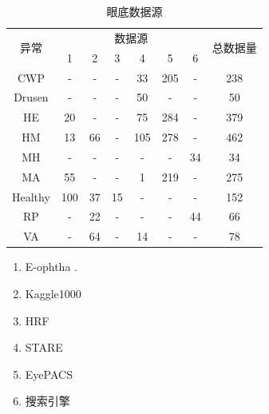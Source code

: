 \documentclass{article}
\begin{document}
		\begin{minipage}[t]{0.6\linewidth}
			{
				\fontsize{9}{12}\selectfont
				{
					\begin{longtable}{cccccccc}
						\caption{眼底数据源}
						\label{tb:Fundus_source}\\
						\toprule
						\multirow{2}{*}{异常}&\multicolumn{6}{c}{数据源}&\multirow{2}{*}{总数据量}\\
						&1&2&3&4&5&6&\\
						\midrule
						CWP    &-  &- &- &33 &205&- &238\\
						Drusen &-  &- &- &50 &-  &- &50 \\     
						HE     &20 &- &- &75 &284&- &379\\ 
						HM     &13 &66&- &105&278&- &462\\     
						MH     &-  &- &- &-  &-  &34&34 \\        
						MA     &55 &- &- &1  &219&- &275\\
						Healthy&100&37&15&-  &-  &- &152\\      
						RP     &-  &22&- &-  &-  &44&66 \\         
						VA     &-  &64&- &14 &-  &- &78 \\
						
						\bottomrule
					\end{longtable}
					
					\vspace{1cm}
					\begin{enumerate}[left=1.5cm]
						
						\item E-ophtha \autocite{E_ophtha}.
						\vspace{-0.2cm}
						
						\item Kaggle1000 \autocite{1000Fundus_Pytorch_TransferLearning}
						\vspace{-0.2cm}
						
						\item HRF \autocite{HRF_2013}
						\vspace{-0.2cm}
						
						\item STARE \autocite{STARE}
						\vspace{-0.2cm}
						
						\item EyePACS \autocite{DR_dataset}
						\vspace{-0.2cm}
						
						\item 搜索引擎
						\vspace{-0.2cm}
						
					\end{enumerate}
					
					\vspace{0.5cm}
				}
			}
		\end{minipage}
		
\end{document}
